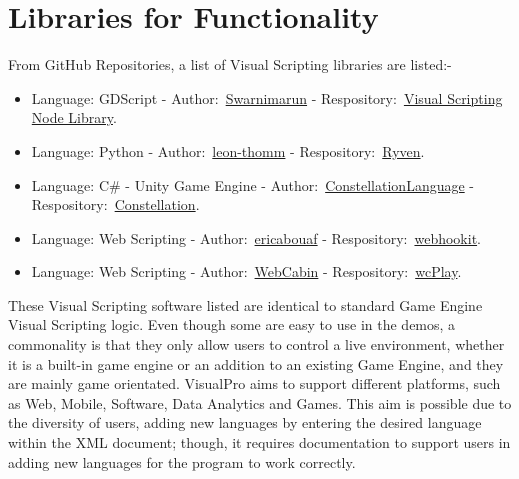\documentclass[12pt]{report} %
\begin{document}
	\section{Libraries for Functionality}
		From GitHub Repositories, a list of Visual Scripting libraries are listed:-
		\begin{itemize}
		\item Language: GDScript - Author:~\href{https://github.com/swarnimarun}{Swarnimarun} - Respository:~\href{https://github.com/swarnimarun/visual-scripting-node-library}{Visual Scripting Node Library}.
		\item Language: Python - Author:~\href{https://github.com/leon-thomm}{leon-thomm} - Respository:~\href{https://github.com/leon-thomm/Ryven}{Ryven}.
		\item Language: C\# - Unity Game Engine - Author:~\href{https://github.com/ConstellationLanguage}{ConstellationLanguage} - Respository:~\href{https://github.com/ConstellationLanguage/Constellation}{Constellation}.
		\item Language: Web Scripting - Author:~\href{https://github.com/ericabouaf}{ericabouaf} - Respository:~\href{https://github.com/ericabouaf/webhookit}{webhookit}.
		\item Language: Web Scripting - Author:~\href{https://github.com/WebCabin}{WebCabin} - Respository:~\href{https://github.com/WebCabin/wcPlay}{wcPlay}.
		\end{itemize}

		These Visual Scripting software listed are identical to standard Game Engine Visual Scripting logic. Even though some are easy to use in the demos, a commonality is that they only allow users to control a live environment, whether it is a built-in game engine or an addition to an existing Game Engine, and they are mainly game orientated. VisualPro aims to support different platforms, such as Web, Mobile, Software, Data Analytics and Games. This aim is possible due to the diversity of users, adding new languages by entering the desired language within the XML document; though, it requires documentation to support users in adding new languages for the program to work correctly.
\end{document}
